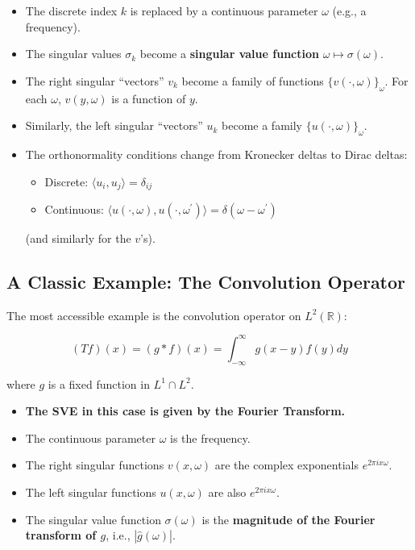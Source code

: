 \documentclass[aps,prl,reprint]{revtex4-2}
\begin{document}
\begin{itemize}
\item The discrete index $k$ is replaced by a continuous parameter $\omega$
(e.g., a frequency).

\item The singular values $\sigma_k$ become a \textbf{singular value function%
} $\omega \mapsto \sigma(\omega)$.

\item The right singular ``vectors'' $v_k$ become a family of functions $%
\{v(\cdot, \omega)\}_{\omega}$. For each $\omega$, $v(y, \omega)$ is a
function of $y$.

\item Similarly, the left singular ``vectors'' $u_k$ become a family $%
\{u(\cdot, \omega)\}_{\omega}$.

\item The orthonormality conditions change from Kronecker deltas to Dirac
deltas: 

\begin{itemize}
\item Discrete: $\langle u_i, u_j \rangle = \delta_{ij}$ 

\item Continuous: $\langle u(\cdot, \omega), u(\cdot, \omega^{\prime })
\rangle = \delta(\omega - \omega^{\prime })$ 
\end{itemize}

(and similarly for the $v$'s).
\end{itemize}

\subsection*{A Classic Example: The Convolution Operator}

The most accessible example is the convolution operator on $L^2(\mathbb{R})$:

\begin{equation*}
(Tf)(x) = (g * f)(x) = \int_{-\infty}^{\infty} g(x - y) f(y) dy 
\end{equation*}

where $g$ is a fixed function in $L^1 \cap L^2$.

\begin{itemize}
\item \textbf{The SVE in this case is given by the Fourier Transform.}

\item The continuous parameter $\omega$ is the frequency.

\item The right singular functions $v(x, \omega)$ are the complex
exponentials $e^{2\pi i x \omega}$.

\item The left singular functions $u(x, \omega)$ are also $e^{2\pi i x
\omega}$.

\item The singular value function $\sigma(\omega)$ is the \textbf{magnitude
of the Fourier transform of $g$}, i.e., $|\hat{g}(\omega)|$.
\end{itemize}
\end{document}
